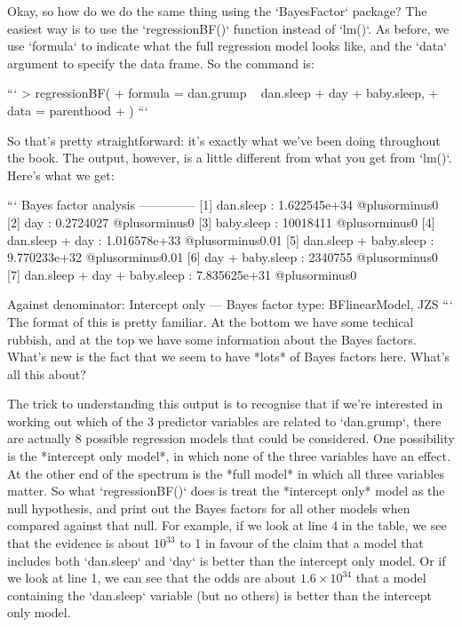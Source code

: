 Okay, so how do we do the same thing using the `BayesFactor` package? The easiest way is to use the `regressionBF()` function instead of `lm()`. As before, we use `formula` to indicate what the full regression model looks like, and the `data` argument to specify the data frame. So the command is:

```
> regressionBF(
+    formula = dan.grump ~ dan.sleep + day + baby.sleep,
+    data = parenthood
+ )
```


So that's pretty straightforward: it's exactly what we've been doing throughout the book. The output, however, is a little different from what you get from `lm()`. Here's what we get:

```
Bayes factor analysis
--------------
[1] dan.sleep                    : 1.622545e+34 @plusorminus0%
[2] day                          : 0.2724027    @plusorminus0%
[3] baby.sleep                   : 10018411     @plusorminus0%
[4] dan.sleep + day              : 1.016578e+33 @plusorminus0.01%
[5] dan.sleep + baby.sleep       : 9.770233e+32 @plusorminus0.01%
[6] day + baby.sleep             : 2340755      @plusorminus0%
[7] dan.sleep + day + baby.sleep : 7.835625e+31 @plusorminus0%

Against denominator:
  Intercept only 
---
Bayes factor type: BFlinearModel, JZS
```
The format of this is pretty familiar. At the bottom we have some techical rubbish, and at the top we have some information about the Bayes factors. What's new is the fact that we seem to have *lots* of Bayes factors here. What's all this about?

The trick to understanding this output is to recognise that if we're interested in working out which of the 3 predictor variables are related to `dan.grump`, there are actually 8 possible regression models that could be considered. One possibility is the *intercept only model*, in which none of the three variables have an effect. At the other end of the spectrum is the *full model* in which all three variables matter. So what `regressionBF()` does is treat the *intercept only* model as the null hypothesis, and print out the Bayes factors for all other models when compared against that null. For example, if we look at line 4 in the table, we see that the evidence is about $10^{33}$ to 1 in favour of the claim that a model that includes both `dan.sleep` and `day` is better than the intercept only model. Or if we look at line 1, we can see that the odds are about $1.6 \times 10^{34}$ that a model containing the `dan.sleep` variable (but no others) is better than the intercept only model.


